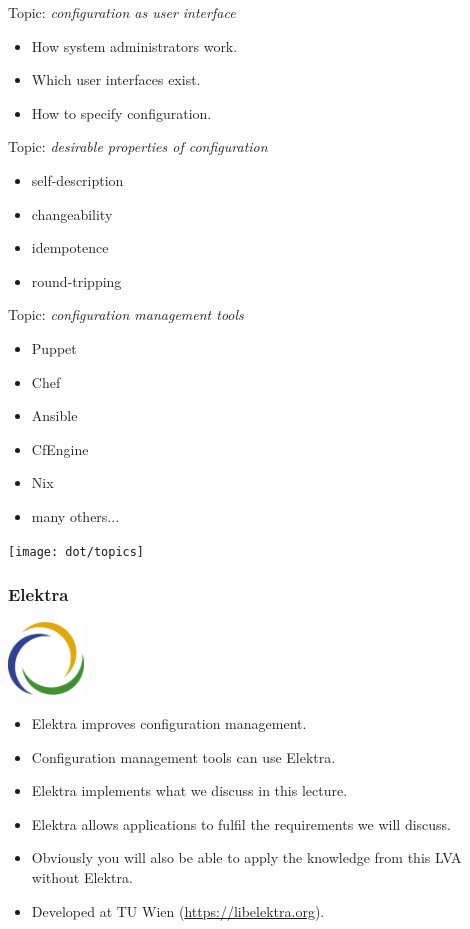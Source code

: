 \begin{frame}
	Topic: \textit{configuration as user interface}
	\begin{itemize}
		\item How system administrators work.
		\item Which user interfaces exist.
		\item How to specify configuration.
	\end{itemize}
\end{frame}

\begin{frame}
	Topic: \textit{desirable properties of configuration}
	\begin{itemize}
		\item self-description
		\item changeability
		\item idempotence
		\item round-tripping
	\end{itemize}
\end{frame}

\begin{frame}
	Topic: \textit{configuration management tools}
	\begin{itemize}
		\item Puppet
		\item Chef
		\item Ansible
		\item CfEngine
		\item Nix
		\item many others...
	\end{itemize}
\end{frame}


\begin{frame}
	\hspace*{-1cm}\texttt{[image: dot/topics]}
\end{frame}

\begin{frame}
	\frametitle{Elektra}
	\hfill \includegraphics[width=2cm]{../figures/logo}
	\vspace{-1cm}
	\begin{itemize}
		\item Elektra improves configuration management.
		\item Configuration management tools can use Elektra.
		\item Elektra implements what we discuss in this lecture.
		\item Elektra allows applications to fulfil the requirements we will discuss.
		\item Obviously you will also be able to apply the knowledge from this LVA without Elektra.
		\item Developed at TU Wien (\url{https://libelektra.org}).
	\end{itemize}
\end{frame}

